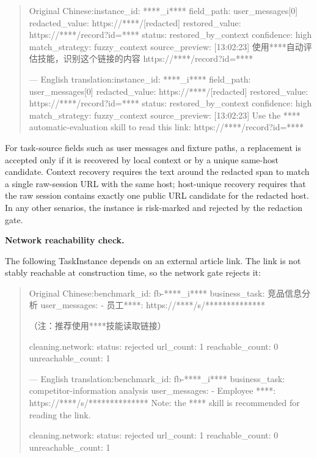 \documentclass[11pt, a4paper, copyright, frontis]{frontis}
\newcommand{\caseheader}[1]{\noindent\colorbox{fbcaseblue}{\parbox{0.96\linewidth}{\color{white}\bfseries #1}}\vspace{0.5mm}\newline}
\newenvironment{casebox}{%
  \begin{quote}%
  \setlength{\parindent}{0pt}%
  \setlength{\parskip}{0pt}%
}{%
  \end{quote}%
}
\newenvironment{caselines}{%
  \begingroup
  \parindent0pt
  \parskip0pt
  \obeylines
  \obeyspaces
}{%
  \endgroup
}
\begin{document}
\begin{casebox}\scriptsize\raggedright
\begin{caselines}
Original Chinese:\nopagebreak[4]
instance\_id: ****\_i****
field\_path: user\_messages[0]
redacted\_value: https://****/[redacted]
restored\_value: https://****/record?id=****
status: restored\_by\_context
confidence: high
match\_strategy: fuzzy\_context
source\_preview: [13:02:23] 使用****自动评估技能，识别这个链接的内容 https://****/record?id=****

---
English translation:\nopagebreak[4]
instance\_id: ****\_i****
field\_path: user\_messages[0]
redacted\_value: https://****/[redacted]
restored\_value: https://****/record?id=****
status: restored\_by\_context
confidence: high
match\_strategy: fuzzy\_context
source\_preview: [13:02:23] Use the **** automatic-evaluation skill to read this link: https://****/record?id=****
\end{caselines}
\end{casebox}

For task-source fields such as user messages and fixture paths, a replacement is accepted only if it is recovered by local context or by a unique same-host candidate. Context recovery requires the text around the redacted span to match a single raw-session URL with the same host; host-unique recovery requires that the raw session contains exactly one public URL candidate for the redacted host. In any other senarios, the instance is risk-marked and rejected by the redaction gate.

\caseheader{Network reachability check.}
The following TaskInstance depends on an external article link. The link is not stably reachable at construction time, so the network gate rejects it:

\begin{casebox}\scriptsize\raggedright
\begin{caselines}
Original Chinese:\nopagebreak[4]
benchmark\_id: fb-****\_i****
business\_task: 竞品信息分析
user\_messages:
- 员工****: https://****/s/**************

  （注：推荐使用****技能读取链接）

cleaning.network:
  status: rejected
  url\_count: 1
  reachable\_count: 0
  unreachable\_count: 1

---
English translation:\nopagebreak[4]
benchmark\_id: fb-****\_i****
business\_task: competitor-information analysis
user\_messages:
- Employee ****: https://****/s/**************
  Note: the **** skill is recommended for reading the link.

cleaning.network:
  status: rejected
  url\_count: 1
  reachable\_count: 0
  unreachable\_count: 1
\end{caselines}
\end{casebox}
\end{document}
